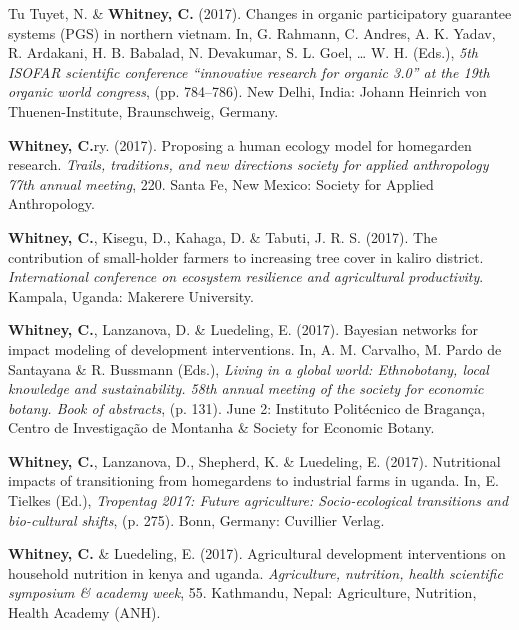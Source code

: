 \documentclass[11pt,a4paper,]{awesome-cv}
\newlength{\cslhangindent}
\newenvironment{CSLReferences}[2] %
 {\begin{list}{}{%
  \setlength{\itemindent}{0pt}
  \setlength{\leftmargin}{0pt}
  \setlength{\parsep}{0pt}
  \ifodd #1
   \setlength{\leftmargin}{\cslhangindent}
   \setlength{\itemindent}{-1\cslhangindent}
  \fi
  \setlength{\itemsep}{#2\baselineskip}}}
 {\end{list}}
\begin{document}
\begin{CSLReferences}{1}{0}
Tu Tuyet, N. \& \textbf{Whitney, C.} (2017). Changes in organic
participatory guarantee systems (PGS) in northern vietnam. In, G.
Rahmann, C. Andres, A. K. Yadav, R. Ardakani, H. B. Babalad, N.
Devakumar, S. L. Goel, \ldots{} W. H. (Eds.), \emph{5th ISOFAR
scientific conference {``innovative research for organic 3.0''} at the
19th organic world congress}, (pp. 784--786). New Delhi, India: Johann
Heinrich von Thuenen-Institute, Braunschweig, Germany.

\textbf{Whitney, C.}ry. (2017). Proposing a human ecology model for
homegarden research. \emph{Trails, traditions, and new directions
society for applied anthropology 77th annual meeting}, 220. Santa Fe,
New Mexico: Society for Applied Anthropology.

\textbf{Whitney, C.}, Kisegu, D., Kahaga, D. \& Tabuti, J. R. S. (2017).
The contribution of small-holder farmers to increasing tree cover in
kaliro district. \emph{International conference on ecosystem resilience
and agricultural productivity}. Kampala, Uganda: Makerere University.

\textbf{Whitney, C.}, Lanzanova, D. \& Luedeling, E. (2017). Bayesian
networks for impact modeling of development interventions. In, A. M.
Carvalho, M. Pardo de Santayana \& R. Bussmann (Eds.), \emph{Living in a
global world: Ethnobotany, local knowledge and sustainability. 58th
annual meeting of the society for economic botany. Book of abstracts},
(p. 131). June 2: Instituto Politécnico de Bragança, Centro de
Investigação de Montanha \& Society for Economic Botany.

\textbf{Whitney, C.}, Lanzanova, D., Shepherd, K. \& Luedeling, E.
(2017). Nutritional impacts of transitioning from homegardens to
industrial farms in uganda. In, E. Tielkes (Ed.), \emph{Tropentag 2017:
Future agriculture: Socio-ecological transitions and bio-cultural
shifts}, (p. 275). Bonn, Germany: Cuvillier Verlag.

\textbf{Whitney, C.} \& Luedeling, E. (2017). Agricultural development
interventions on household nutrition in kenya and uganda.
\emph{Agriculture, nutrition, health scientific symposium \& academy
week}, 55. Kathmandu, Nepal: Agriculture, Nutrition, Health Academy
(ANH).


\end{CSLReferences}
\end{document}
